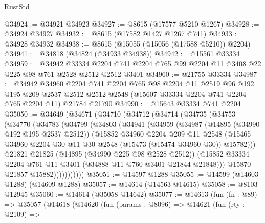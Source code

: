 \begin{lexlean}{RustStd}
\begin{coremodule}
@34924 := @34921 @34923
@34927 := @8615 (@17577 @5210 @1267)
@34928 := @34924 @34927
@34932 := @8615 (@17582 @1427 @1267 @741)
@34933 := @34928 @34932
@34938 := @8615 (@15055 (@15056 (@17588 @5210)) @2204)
@34941 := @34818 (@34824 (@34933 @34938))
@34942 := @15561 @33334
@34959 := @34942
    @33334
    @2204
    @741
    @2204
    @765
    @99
    @2204
    @11
    @3408
    @22
    @225
    @98
    @761
    @2528
    @2512
    @2512
    @3401
@34960 := @21755 @33334
@34987 := @34942
    @34960
    @2204
    @741
    @2204
    @765
    @98
    @2204
    @11
    @2519
    @96
    @192
    @195
    @209
    @2537
    @2512
    @2512
    @2548
    (@15607 @33334 @2204 @741 @2204 @765 @2204 @11)
    @21784
    @21790
@34990 := @15643 @33334 @741 @2204
@35050 := @34649
    (@34671
      (@34710
        (@34712
          (@34714
            (@34735
              (@34753
                (@34770
                  (@34783
                    (@34799
                      (@34803
                        (@34941
                          (@34959
                            (@34987
                              (@14895 (@34990 @192 @195 @2537 @2512))
                              (@15852
                                @34960
                                @2204
                                @209
                                @11
                                @2548
                                (@15465
                                  @34960
                                  @2204
                                  @30
                                  @11
                                  @30
                                  @2548
                                  (@15473 (@15474 @34960 @30))
                                  @15782)))
                            @21821
                            @21825
                            (@14895 (@34990 @225 @98 @2528 @2512))
                            (@15852
                              @33334
                              @2204
                              @761
                              @11
                              @3401
                              (@34888 @11 @760 @3401 @21844 @21848)))
                          @15870
                          @21857
                          @15882)))))))))))
@35051 := @14597 @1288
@35055 := @14599 (@14603 @1288) (@14609 @1288)
@35057 := @14614 (@14563 @14615)
@35058 := @8103 @12945
@35060 := @14614 (@35058 @14642)
@35077 := @14613
    (fun (fn : @89) =>
    @35057
      (@14618
        (@14620
          (fun (params : @8096) =>
          @14621
            (fun (rty : @2109) =>

\end{coremodule}
\end{lexlean}
